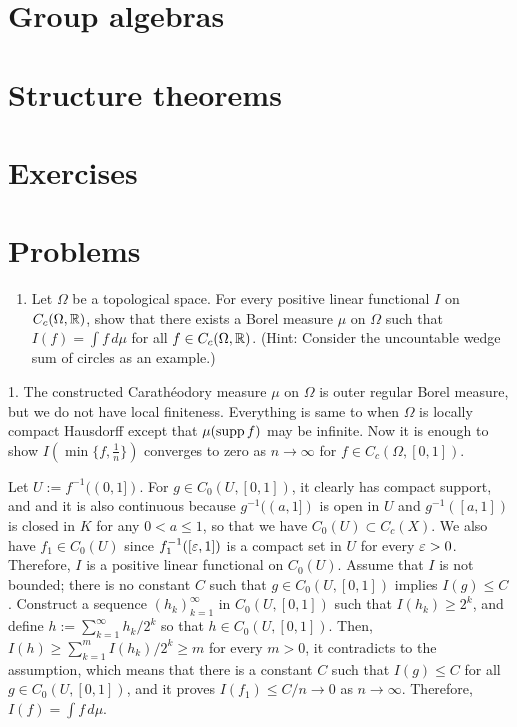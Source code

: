 \documentclass{../../large}
\begin{document}
\fi




\section{Group algebras}
\begin{prb}
\end{prb}
\begin{prb}[Convolution]
\end{prb}

\section{Structure theorems}

\section*{Exercises}
\begin{prb}
\end{prb}

\section*{Problems}
\begin{enumerate}
\item Let $\Omega$ be a topological space. For every positive linear functional $I$ on $C_c(\Omega,\mathbb{R})$, show that there exists a Borel measure $\mu$ on $\Omega$ such that $I(f)=\int f\,d\mu$ for all $f\in C_c(\Omega,\mathbb{R})$. (Hint: Consider the uncountable wedge sum of circles as an example.)
\end{enumerate}
\begin{sol}
1.
The constructed Carath\'eodory measure $\mu$ on $\Omega$ is outer regular Borel measure, but we do not have local finiteness.
Everything is same to when $\Omega$ is locally compact Hausdorff except that $\mu(\operatorname{supp} f)$ may be infinite.
Now it is enough to show $I(\min\{f,\frac1n\})$ converges to zero as $n\to\infty$ for $f\in C_c(\Omega,[0,1])$.

Let $U:=f^{-1}((0,1])$.
For $g\in C_0(U,[0,1])$, it clearly has compact support, and and it is also continuous because $g^{-1}((a,1])$ is open in $U$ and $g^{-1}([a,1])$ is closed in $K$ for any $0<a\le1$, so that we have $C_0(U)\subset C_c(X)$.
We also have $f_1\in C_0(U)$ since $f_1^{-1}([\varepsilon,1])$ is a compact set in $U$ for every $\varepsilon>0$.
Therefore, $I$ is a positive linear functional on $C_0(U)$.
Assume that $I$ is not bounded; there is no constant $C$ such that $g\in C_0(U,[0,1])$ implies $I(g)\le C$.
Construct a sequence $(h_k)_{k=1}^\infty$ in $C_0(U,[0,1])$ such that $I(h_k)\ge2^k$, and define $h:=\sum_{k=1}^\infty h_k/2^k$ so that $h\in C_0(U,[0,1])$.
Then, $I(h)\ge \sum_{k=1}^mI(h_k)/2^k\ge m$ for every $m>0$, it contradicts to the assumption, which means that there is a constant $C$ such that $I(g)\le C$ for all $g\in C_0(U,[0,1])$, and it proves $I(f_1)\le C/n\to0$ as $n\to\infty$.
Therefore, $I(f)=\int f\,d\mu$.
\end{sol}
\end{document}
